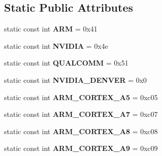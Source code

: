 \subsection*{Static Public Attributes}
\begin{DoxyCompactItemize}
\item 
static const int {\bfseries A\+RM} = 0x41\hypertarget{classv8_1_1base_1_1_c_p_u_a84a60a9c8739ef4ddcf39d2cccbba429}{}\label{classv8_1_1base_1_1_c_p_u_a84a60a9c8739ef4ddcf39d2cccbba429}

\item 
static const int {\bfseries N\+V\+I\+D\+IA} = 0x4e\hypertarget{classv8_1_1base_1_1_c_p_u_a904c908bf843365aec523725cf969620}{}\label{classv8_1_1base_1_1_c_p_u_a904c908bf843365aec523725cf969620}

\item 
static const int {\bfseries Q\+U\+A\+L\+C\+O\+MM} = 0x51\hypertarget{classv8_1_1base_1_1_c_p_u_a1adf680bac5c859060936507cf97af95}{}\label{classv8_1_1base_1_1_c_p_u_a1adf680bac5c859060936507cf97af95}

\item 
static const int {\bfseries N\+V\+I\+D\+I\+A\+\_\+\+D\+E\+N\+V\+ER} = 0x0\hypertarget{classv8_1_1base_1_1_c_p_u_afee8892c349b397d405ecb6b2d3bf71e}{}\label{classv8_1_1base_1_1_c_p_u_afee8892c349b397d405ecb6b2d3bf71e}

\item 
static const int {\bfseries A\+R\+M\+\_\+\+C\+O\+R\+T\+E\+X\+\_\+\+A5} = 0xc05\hypertarget{classv8_1_1base_1_1_c_p_u_a3bf89e4327b692292af586fcbd6eb09f}{}\label{classv8_1_1base_1_1_c_p_u_a3bf89e4327b692292af586fcbd6eb09f}

\item 
static const int {\bfseries A\+R\+M\+\_\+\+C\+O\+R\+T\+E\+X\+\_\+\+A7} = 0xc07\hypertarget{classv8_1_1base_1_1_c_p_u_af2573b88c1699b13c4b22b601e112d78}{}\label{classv8_1_1base_1_1_c_p_u_af2573b88c1699b13c4b22b601e112d78}

\item 
static const int {\bfseries A\+R\+M\+\_\+\+C\+O\+R\+T\+E\+X\+\_\+\+A8} = 0xc08\hypertarget{classv8_1_1base_1_1_c_p_u_a9ed97a7d9550211dda1285f5f57f4fcf}{}\label{classv8_1_1base_1_1_c_p_u_a9ed97a7d9550211dda1285f5f57f4fcf}

\item 
static const int {\bfseries A\+R\+M\+\_\+\+C\+O\+R\+T\+E\+X\+\_\+\+A9} = 0xc09\hypertarget{classv8_1_1base_1_1_c_p_u_acc388963e336d95235eac735073cf948}{}\label{classv8_1_1base_1_1_c_p_u_acc388963e336d95235eac735073cf948}


\end{DoxyCompactItemize}
